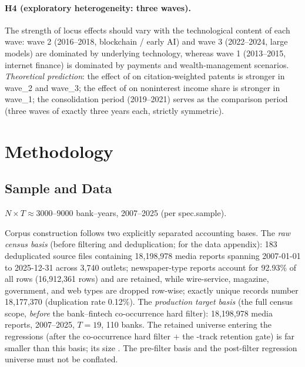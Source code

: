 \paragraph{H4 (exploratory heterogeneity: three waves).}
The strength of locus effects should vary with the technological content of each wave:
wave 2 (2016--2018, blockchain / early AI) and wave 3 (2022--2024, large models) are
dominated by underlying technology, whereas wave 1 (2013--2015, internet finance) is
dominated by payments and wealth-management scenarios. \emph{Theoretical prediction}:
the effect of  on citation-weighted patents is stronger in
wave\_2 and wave\_3; the effect of  on noninterest income
share is stronger in wave\_1; the consolidation period (2019--2021) serves as the
comparison period (three waves of exactly three years each, strictly symmetric).

\section{Methodology}\label{sec:method}

\subsection{Sample and Data}

$N \times T \approx 3000\text{--}9000$ bank--years, 2007--2025 (per spec.sample).

Corpus construction follows two explicitly separated accounting bases. The \emph{raw
census basis} (before filtering and deduplication; for the data appendix): 183
deduplicated source files containing 18{,}198{,}978 media reports spanning 2007-01-01 to
2025-12-31 across 3{,}740 outlets; newspaper-type reports account for 92.93\% of all
rows (16{,}912{,}361 rows) and are retained, while wire-service, magazine, government,
and web types are dropped row-wise; exactly unique records number 18{,}177{,}370
(duplication rate 0.12\%). The \emph{production target basis} (the full census scope,
\emph{before} the bank--fintech co-occurrence hard filter):
18{,}198{,}978 media reports, 2007--2025, $T=19$, 110 banks. The retained universe entering the
regressions (after the co-occurrence hard filter $+$ the -track retention
gate) is far smaller than this basis; its size . The pre-filter basis and the post-filter regression universe must not be conflated.

